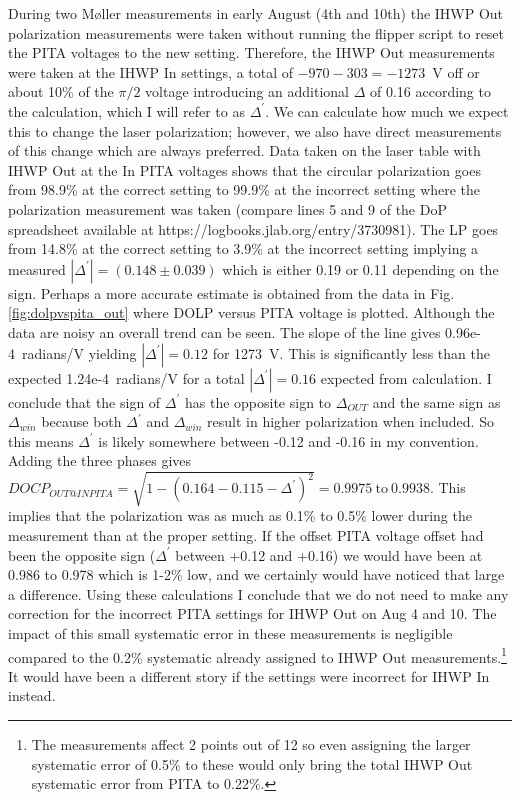 \documentclass[12pt]{article}
\begin{document}
During two M\o ller measurements in early August (4th and 10th) the IHWP Out polarization measurements were taken without running the flipper script to reset the PITA voltages to the new setting. Therefore, the IHWP Out measurements were taken at the IHWP In settings, a total of $-970-303=-1273$~V off or about 10\% of the $\pi/2$ voltage introducing an additional $\Delta$ of 0.16 according to the calculation, which I will refer to as $\Delta^{\prime}$. We can calculate how much we expect this to change the laser polarization; however, we also have direct measurements of this change which are always preferred. Data taken on the laser table with IHWP Out at the In PITA voltages shows that the circular polarization goes from 98.9\% at the correct setting to 99.9\% at the incorrect setting where the polarization measurement was taken (compare lines 5 and 9 of the DoP spreadsheet available at https://logbooks.jlab.org/entry/3730981). The LP  goes from 14.8\% at the correct setting to 3.9\% at the incorrect setting implying a measured $\left|\Delta^{\prime}\right|=(0.148\pm0.039)$ which is either 0.19 or 0.11 depending on the sign.  Perhaps a more accurate estimate is obtained from the data in Fig. \ref{fig:dolpvspita_out} where DOLP versus PITA voltage is plotted. Although the data are noisy an overall trend can be seen. The slope of the line gives 0.96e-4~radians/V yielding $\left|\Delta^\prime\right|=0.12$ for 1273~V. This is significantly less than the expected 1.24e-4~radians/V for a total $\left|\Delta^\prime\right|=0.16$ expected from calculation.   I conclude that the sign of $\Delta^{\prime}$ has the opposite sign to $\Delta_{OUT}$ and the same sign as $\Delta_{win}$ because both $\Delta^{\prime}$ and $\Delta_{win}$ result in higher polarization when included. So this means $\Delta^{\prime}$ is likely somewhere between -0.12  and -0.16 in my convention. Adding the three phases gives $DOCP_{OUT@IN PITA}=\sqrt{1-(0.164-0.115-\Delta^{\prime})^2}=0.9975~\textrm{to}~0.9938$. This implies that the polarization was as much as 0.1\% to 0.5\% lower during the measurement than at the proper setting. If the offset PITA voltage offset had been the opposite sign ($\Delta^{\prime}$ between +0.12 and +0.16) we would have been at 0.986 to 0.978 which is 1-2\% low, and we certainly would have noticed that large a difference. \textrm{Using these calculations I conclude that we do not need to make any correction for the incorrect PITA settings for IHWP Out on Aug 4 and 10. The impact of this small systematic error in these measurements is negligible compared to the 0.2\% systematic already assigned to IHWP Out measurements.}\footnote{The measurements affect 2 points out of 12 so even assigning the larger systematic error of 0.5\% to these would only bring the total IHWP Out systematic error from PITA to 0.22\%.} It would have been a different story if the settings were incorrect for IHWP In instead.
\end{document}
